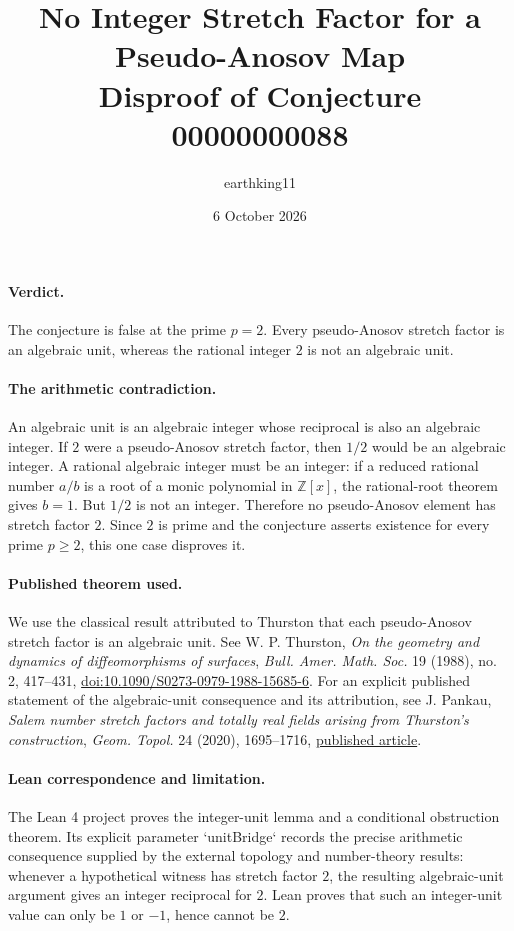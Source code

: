 \documentclass[11pt]{article}
\title{No Integer Stretch Factor for a Pseudo-Anosov Map\\[2pt]\large Disproof of Conjecture 00000000088}
\author{earthking11}
\date{6 October 2026}
\begin{document}
\maketitle

\paragraph{Verdict.} The conjecture is false at the prime $p=2$. Every pseudo-Anosov stretch factor is an algebraic unit, whereas the rational integer $2$ is not an algebraic unit.

\paragraph{The arithmetic contradiction.} An algebraic unit is an algebraic integer whose reciprocal is also an algebraic integer. If $2$ were a pseudo-Anosov stretch factor, then $1/2$ would be an algebraic integer. A rational algebraic integer must be an integer: if a reduced rational number $a/b$ is a root of a monic polynomial in $\mathbb Z[x]$, the rational-root theorem gives $b=1$. But $1/2$ is not an integer. Therefore no pseudo-Anosov element has stretch factor $2$. Since $2$ is prime and the conjecture asserts existence for every prime $p\ge2$, this one case disproves it.

\paragraph{Published theorem used.} We use the classical result attributed to Thurston that each pseudo-Anosov stretch factor is an algebraic unit. See W. P. Thurston, \emph{On the geometry and dynamics of diffeomorphisms of surfaces}, \emph{Bull. Amer. Math. Soc.} 19 (1988), no. 2, 417--431, \href{https://doi.org/10.1090/S0273-0979-1988-15685-6}{doi:10.1090/S0273-0979-1988-15685-6}. For an explicit published statement of the algebraic-unit consequence and its attribution, see J. Pankau, \emph{Salem number stretch factors and totally real fields arising from Thurston's construction}, \emph{Geom. Topol.} 24 (2020), 1695--1716, \href{https://msp.org/gt/2020/24-4/gt-v24-n4-p.pdf}{published article}.

\paragraph{Lean correspondence and limitation.} The Lean 4 project proves the integer-unit lemma and a conditional obstruction theorem. Its explicit parameter `unitBridge` records the precise arithmetic consequence supplied by the external topology and number-theory results: whenever a hypothetical witness has stretch factor $2$, the resulting algebraic-unit argument gives an integer reciprocal for $2$. Lean proves that such an integer-unit value can only be $1$ or $-1$, hence cannot be $2$.
\end{document}
